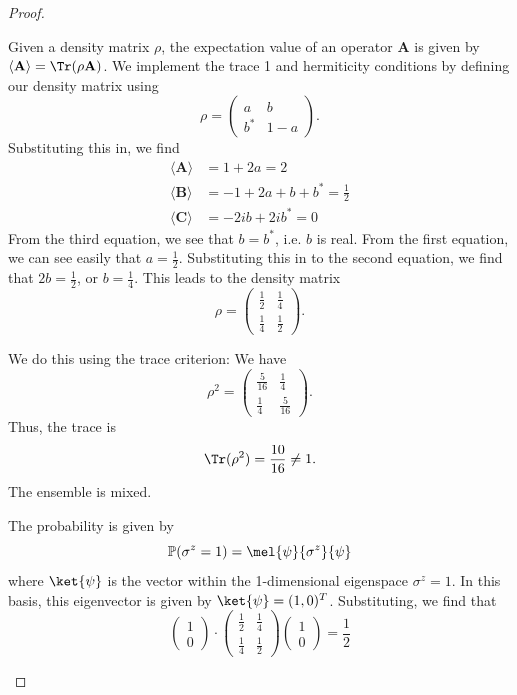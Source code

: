 \begin{proof}
	\begin{parts}
	\item Given a density matrix $\rho$, the expectation value of an operator $\mathbf{A}$ is given by $\langle \mathbf{A}\rangle = \Tr(\rho \mathbf{A})$. We implement the trace 1 and hermiticity conditions by defining our density matrix using
		\[
			\rho = \begin{pmatrix} a & b \\ b^* & 1-a \end{pmatrix} 
		.\] 
		Substituting this in, we find
		\begin{align*}
			\langle \mathbf{A}\rangle &= 1+2a = 2 \\
			\langle \mathbf{B}\rangle &= -1+2a+b+b^* = \frac{1}{2} \\
			\langle \mathbf{C}\rangle &= -2ib + 2ib^*=0 
		\end{align*}
		From the third equation, we see that $b=b^*$, i.e. $b$ is real. From the first equation, we can see easily that $a = \frac{1}{2}$. Substituting this in to the second equation, we find that $2b = \frac{1}{2}$, or $b = \frac{1}{4}$. This leads to the density matrix
		\[
			\rho = \begin{pmatrix} \frac{1}{2} & \frac{1}{4}\\ \frac{1}{4} & \frac{1}{2} \end{pmatrix} 
		.\] 
	\item We do this using the trace criterion: We have
		\[
			\rho^2 = \begin{pmatrix} \frac{5}{16} & \frac{1}{4} \\ \frac{1}{4} & \frac{5}{16} \end{pmatrix} 
		.\] 
		Thus, the trace is
		\[
		\Tr(\rho^2) = \frac{10}{16}\neq 1
		.\] 
		The ensemble is mixed.
	\item The probability is given by
		\[
			\mathbb{P}(\sigma^z=1) = \mel{\psi}{\sigma^z}{\psi}
		\]
		where $\ket{\psi}$ is the vector within the 1-dimensional eigenspace $\sigma^z=1$. In this basis, this eigenvector is given by $\ket{\psi}=(1,0)^T$. Substituting, we find that
		\[
			\begin{pmatrix} 1 \\ 0 \end{pmatrix} \cdot \begin{pmatrix} \frac{1}{2} & \frac{1}{4}\\ \frac{1}{4} & \frac{1}{2} \end{pmatrix} \begin{pmatrix} 1 \\ 0 \end{pmatrix} = \frac{1}{2}
\]
\end{parts}
\end{proof}

